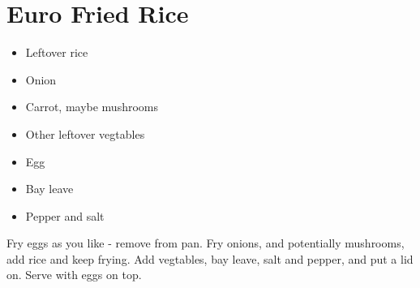 \section{Euro Fried Rice}{
  \begin{itemize}
    \item Leftover rice
    \item Onion
    \item Carrot, maybe mushrooms
    \item Other leftover vegtables
    \item Egg
    \item Bay leave
    \item Pepper and salt
  \end{itemize}
  \vspace{.25in}

  Fry eggs as you like - remove from pan. Fry onions, and potentially mushrooms,
  add rice and keep frying. Add vegtables, bay leave, salt and pepper,
  and put a lid on. Serve with eggs on top.

}
